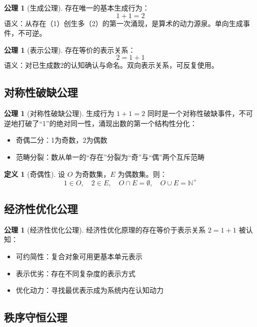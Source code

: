 \documentclass[12pt]{article}
\theoremstyle{definition}
\newtheorem{definition}[theorem]{定义}
\newtheorem{axiom}[theorem]{公理}
\newcommand{\N}{\mathbb{N}}
\begin{document}
\begin{axiom}[生成公理]
存在唯一的基本生成行为：
\[
1 + 1 = 2
\]
语义：从存在（1）创生多（2）的第一次涌现，是算术的动力源泉。单向生成事件，不可逆。
\end{axiom}

\begin{axiom}[表示公理]
存在等价的表示关系：
\[
2 = 1 + 1
\]
语义：对已生成数2的认知确认与命名。双向表示关系，可反复使用。
\end{axiom}

\subsection{对称性破缺公理}

\begin{axiom}[对称性破缺公理]
生成行为 \(1+1=2\) 同时是一个对称性破缺事件，不可逆地打破了“1”的绝对同一性，涌现出数的第一个结构性分化：
\begin{itemize}
    \item 奇偶二分：1为奇数，2为偶数
    \item 范畴分裂：数从单一的“存在”分裂为“奇”与“偶”两个互斥范畴
\end{itemize}
\end{axiom}

\begin{definition}[奇偶性]
设 \(O\) 为奇数集，\(E\) 为偶数集。则：
\[
1 \in O,\quad 2 \in E,\quad O \cap E = \emptyset,\quad O \cup E = \N^+
\]
\end{definition}

\subsection{经济性优化公理}

\begin{axiom}[经济性优化公理]
经济性优化原理的存在等价于表示关系 \(2=1+1\) 被认知：
\begin{itemize}
    \item 可约简性：复合对象可用更基本单元表示
    \item 表示优劣：存在不同复杂度的表示方式
    \item 优化动力：寻找最优表示成为系统内在认知动力
\end{itemize}
\end{axiom}

\subsection{秩序守恒公理}
\end{document}
